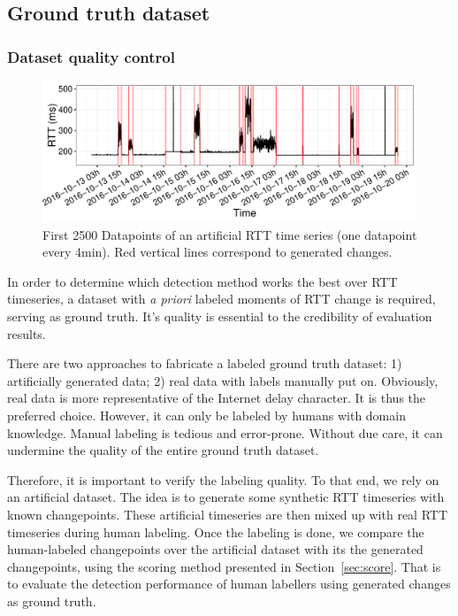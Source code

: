 \subsection{Ground truth dataset}
\label{sec:label}

\subsubsection{Dataset quality control}

\begin{figure}[!htb]
\centering
\includegraphics[width=.96\textwidth]{gfx/chap4/artificial_trace.pdf}
\caption{First 2500 %
Datapoints of an artificial RTT time series (one datapoint every 4min). 
Red vertical lines correspond to generated changes.}
\label{fig:art_example}
\end{figure}

In order to determine which detection method works the best over RTT timeseries, 
a dataset with \textit{a priori} labeled moments of RTT change is required, serving as ground truth.
It's quality is essential to the credibility of evaluation results.

There are two approaches to fabricate a labeled ground truth dataset: 1) artificially generated data; 2) real data with labels manually put on.
Obviously, real data is more representative of the Internet delay character.
It is thus the preferred choice.
However, it can only be labeled by humans with domain knowledge.
Manual labeling is tedious and error-prone.
Without due care, it can undermine the quality of the entire ground truth dataset.

Therefore, it is important to verify the labeling quality.
To that end, we rely on an artificial dataset.
The idea is to generate some synthetic RTT timeseries with known changepoints.
These artificial timeseries are then mixed up with real RTT timeseries during human labeling.
Once the labeling is done, we compare the human-labeled changepoints over the artificial dataset with its the generated changepoints, using the scoring method presented in Section~\ref{sec:score}.
That is to evaluate the detection performance of human labellers using generated changes as ground truth.

